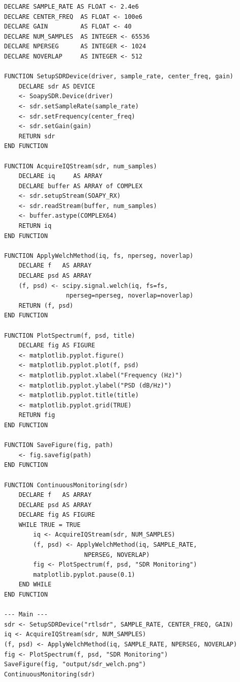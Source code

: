 \documentclass[11pt]{article}
\begin{document}
\begin{lstlisting}[caption={SDR Monitoring --- pseudocode-specific conventions}]
DECLARE SAMPLE_RATE AS FLOAT <- 2.4e6
DECLARE CENTER_FREQ  AS FLOAT <- 100e6
DECLARE GAIN         AS FLOAT <- 40
DECLARE NUM_SAMPLES  AS INTEGER <- 65536
DECLARE NPERSEG      AS INTEGER <- 1024
DECLARE NOVERLAP     AS INTEGER <- 512

FUNCTION SetupSDRDevice(driver, sample_rate, center_freq, gain)
    DECLARE sdr AS DEVICE
    <- SoapySDR.Device(driver)
    <- sdr.setSampleRate(sample_rate)
    <- sdr.setFrequency(center_freq)
    <- sdr.setGain(gain)
    RETURN sdr
END FUNCTION

FUNCTION AcquireIQStream(sdr, num_samples)
    DECLARE iq     AS ARRAY
    DECLARE buffer AS ARRAY of COMPLEX
    <- sdr.setupStream(SOAPY_RX)
    <- sdr.readStream(buffer, num_samples)
    <- buffer.astype(COMPLEX64)
    RETURN iq
END FUNCTION

FUNCTION ApplyWelchMethod(iq, fs, nperseg, noverlap)
    DECLARE f   AS ARRAY
    DECLARE psd AS ARRAY
    (f, psd) <- scipy.signal.welch(iq, fs=fs,
                 nperseg=nperseg, noverlap=noverlap)
    RETURN (f, psd)
END FUNCTION

FUNCTION PlotSpectrum(f, psd, title)
    DECLARE fig AS FIGURE
    <- matplotlib.pyplot.figure()
    <- matplotlib.pyplot.plot(f, psd)
    <- matplotlib.pyplot.xlabel("Frequency (Hz)")
    <- matplotlib.pyplot.ylabel("PSD (dB/Hz)")
    <- matplotlib.pyplot.title(title)
    <- matplotlib.pyplot.grid(TRUE)
    RETURN fig
END FUNCTION

FUNCTION SaveFigure(fig, path)
    <- fig.savefig(path)
END FUNCTION

FUNCTION ContinuousMonitoring(sdr)
    DECLARE f   AS ARRAY
    DECLARE psd AS ARRAY
    DECLARE fig AS FIGURE
    WHILE TRUE = TRUE
        iq <- AcquireIQStream(sdr, NUM_SAMPLES)
        (f, psd) <- ApplyWelchMethod(iq, SAMPLE_RATE,
                      NPERSEG, NOVERLAP)
        fig <- PlotSpectrum(f, psd, "SDR Monitoring")
        matplotlib.pyplot.pause(0.1)
    END WHILE
END FUNCTION

--- Main ---
sdr <- SetupSDRDevice("rtlsdr", SAMPLE_RATE, CENTER_FREQ, GAIN)
iq <- AcquireIQStream(sdr, NUM_SAMPLES)
(f, psd) <- ApplyWelchMethod(iq, SAMPLE_RATE, NPERSEG, NOVERLAP)
fig <- PlotSpectrum(f, psd, "SDR Monitoring")
SaveFigure(fig, "output/sdr_welch.png")
ContinuousMonitoring(sdr)
\end{lstlisting}
\end{document}
